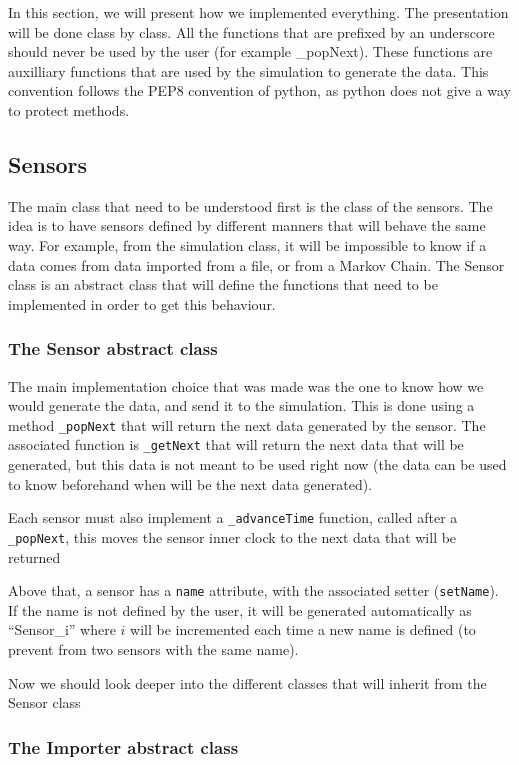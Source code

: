 
In this section, we will present how we implemented everything. The
presentation will be done class by class. All the functions that are
prefixed by an underscore should never be used by the user (for example
\_popNext). These functions are auxilliary functions that are used by the
simulation to generate the data. This convention follows the PEP8 convention of
python, as python does not give a way to protect methods.

\subsection{Sensors}

The main class that need to be understood first is the class of the
sensors. The idea is to have sensors defined by different manners that will
behave the same way. For example, from the simulation class, it will be
impossible to know if a data comes from data imported from a file, or from
a Markov Chain. The Sensor class is an abstract class that will define the
functions that need to be implemented in order to get this behaviour.

\subsubsection{The Sensor abstract class}

The main implementation choice that was made was the one to know how we would
generate the data, and send it to the simulation. This is done using a method
\verb!_popNext! that will return the next data generated by the sensor. The
associated function is \verb!_getNext! that will return the next data that will
be generated, but this data is not meant to be used right now (the data can be
used to know beforehand when will be the next data generated).

Each sensor must also implement a \verb!_advanceTime! function, called after a
\verb!_popNext!, this moves the sensor inner clock to the next data that will
be returned

Above that, a sensor has a \verb!name! attribute, with the associated setter
(\verb!setName!). If the name is not defined by the user, it will be generated
automatically as ``Sensor\_i'' where $i$ will be incremented each time a new
name is defined (to prevent from two sensors with the same name).

Now we should look deeper into the different classes that will inherit from the
Sensor class

\subsubsection{The Importer abstract class}

